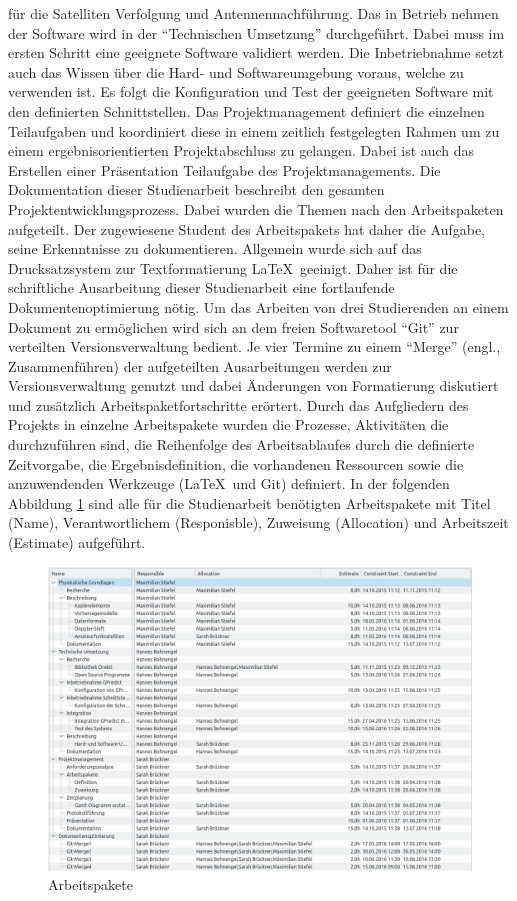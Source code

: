 für die Satelliten Verfolgung und  Antennennachführung. Das in Betrieb nehmen der Software wird in der ``Technischen Umsetzung'' 
durchgeführt. Dabei muss im ersten Schritt eine geeignete Software validiert werden. Die 
Inbetriebnahme setzt auch das Wissen über die Hard- und Softwareumgebung voraus, welche zu 
verwenden ist. Es folgt die Konfiguration und Test der geeigneten Software mit den definierten 
Schnittstellen.
\newpar
Das Projektmanagement definiert die einzelnen Teilaufgaben und koordiniert diese in einem zeitlich 
festgelegten Rahmen um zu einem ergebnisorientierten Projektabschluss zu gelangen. Dabei ist auch 
das Erstellen einer Präsentation Teilaufgabe des Projektmanagements.
\newpar
Die Dokumentation dieser Studienarbeit beschreibt den gesamten Projektentwicklungsprozess. Dabei wurden die Themen nach den Arbeitspaketen 
aufgeteilt. Der zugewiesene Student des Arbeitspakets hat daher die Aufgabe, seine Erkenntnisse zu dokumentieren. Allgemein wurde sich 
auf das Drucksatzsystem zur Textformatierung \LaTeX\ geeinigt. Daher ist für die schriftliche Ausarbeitung dieser Studienarbeit eine 
fortlaufende Dokumentenoptimierung nötig. Um das Arbeiten von drei Studierenden an einem Dokument zu ermöglichen wird sich an dem freien 
Softwaretool ``Git'' zur verteilten Versionsverwaltung bedient. Je vier Termine zu einem ``Merge'' (engl., Zusammenführen) der 
aufgeteilten Ausarbeitungen werden zur Versionsverwaltung genutzt und dabei Änderungen von Formatierung diskutiert und zusätzlich 
Arbeitspaketfortschritte erörtert. 
\newpar
Durch das Aufgliedern des Projekts in einzelne Arbeitspakete wurden die Prozesse, Aktivitäten die durchzuführen sind, die Reihenfolge des 
Arbeitsablaufes durch die definierte Zeitvorgabe, die Ergebnisdefinition, die vorhandenen Ressourcen sowie die anzuwendenden Werkzeuge (\LaTeX\ und 
Git) definiert.  
In der folgenden Abbildung \ref{fig:arbeitspaket} sind alle für die Studienarbeit benötigten 
Arbeitspakete mit Titel (Name), Verantwortlichem (Responisble), Zuweisung (Allocation) und 
Arbeitszeit (Estimate) aufgeführt.
\begin{figure}[h] 
 \centering
\includegraphics[width=1.0\linewidth]{./images/03task}
\caption{Arbeitspakete}
 \label{fig:arbeitspaket}
\end{figure}
\newpage

